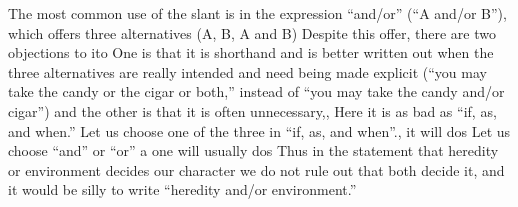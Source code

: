 \documentclass[
    oneside,
    11pt,
    draft
]{memoir}
\begin{document}
The most common use of the slant is in the expression \enquote{and/or} (\enquote{A and/or B}), which offers three alternatives (A, B, A and B) Despite this offer, there are two objections to ito One is that it is shorthand and is better written out when the three alternatives are really intended and need being made explicit (\enquote{you may take the candy or the cigar or both,} instead of \enquote{you may take the candy and/or cigar}) and the other is that it is often unnecessary,, Here it is as bad as \enquote{if, as, and when.} Let us choose one of the three in \enquote{if, as, and when}., it will dos Let us choose \enquote{and} or \enquote{or} a one will usually dos Thus in the statement that heredity or environment decides our character we do not rule out that both decide it, and it would be silly to write \enquote{heredity and/or environment.}
\end{document}
